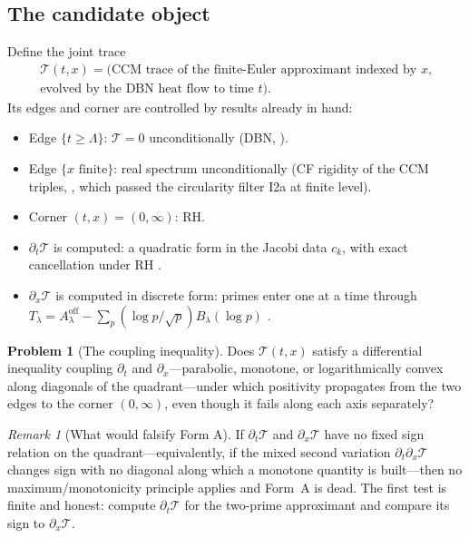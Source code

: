 \documentclass[11pt]{amsart}
\theoremstyle{definition}
\newtheorem{problem}[theorem]{Problem}
\theoremstyle{remark}
\newtheorem{remark}[theorem]{Remark}
\newcommand{\Tl}{T_\lambda}
\begin{document}
\subsection{The candidate object}
Define the joint trace
\begin{multline*}
\mathcal{T}(t,x)=\text{(CCM trace of the finite-Euler approximant indexed by }x\text{,}\\
\text{evolved by the DBN heat flow to time }t).
\end{multline*}
Its edges and corner are controlled by results already in hand:
\begin{itemize}
\item Edge $\{t\geq\Lambda\}$: $\mathcal{T}=0$ unconditionally (DBN, \cite[Docs~70--71]{P40}).
\item Edge $\{x\text{ finite}\}$: real spectrum unconditionally (CF rigidity of the CCM triples, \cite[]{P40}, which passed the circularity filter I2a at finite level).
\item Corner $(t,x)=(0,\infty)$: RH.
\item $\partial_t\mathcal{T}$ is computed: a quadratic form in the Jacobi data $c_k$, with exact cancellation under RH \cite[]{P40}.
\item $\partial_x\mathcal{T}$ is computed in discrete form: primes enter one at a time through $\Tl=A_\lambda^{\mathrm{off}}-\sum_p(\log p/\sqrt p)B_\lambda(\log p)$ \cite[]{P40}.
\end{itemize}

\begin{problem}[The coupling inequality]\label{prob:coupling}
Does $\mathcal{T}(t,x)$ satisfy a differential inequality coupling
$\partial_t$ and $\partial_x$---parabolic, monotone, or logarithmically
convex along diagonals of the quadrant---under which positivity propagates
from the two edges to the corner $(0,\infty)$, even though it fails along
each axis separately?
\end{problem}

\begin{remark}[What would falsify Form A]
If $\partial_t\mathcal{T}$ and $\partial_x\mathcal{T}$ have no fixed sign
relation on the quadrant---equivalently, if the mixed second variation
$\partial_t\partial_x\mathcal{T}$ changes sign with no diagonal along which
a monotone quantity is built---then no maximum/monotonicity principle
applies and Form~A is dead. The first test is finite and honest: compute
$\partial_t\mathcal{T}$ for the two-prime approximant and compare its sign
to $\partial_x\mathcal{T}$.
\end{remark}
\end{document}
